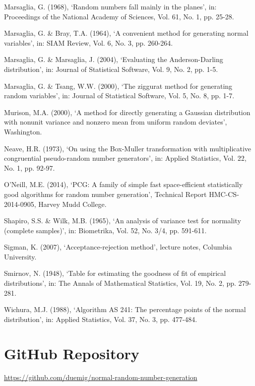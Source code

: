 \documentclass[12pt,a4paper]{article}
\begin{document}
\begin{list}{}{\leftmargin=0pt\itemsep=6pt\parsep=0pt}
\item[] [12] Marsaglia, G. (1968), `Random numbers fall mainly in the planes', in: Proceedings of the National Academy of Sciences, Vol. 61, No. 1, pp. 25-28.
\item[] [13] Marsaglia, G. \& Bray, T.A. (1964), `A convenient method for generating normal variables', in: SIAM Review, Vol. 6, No. 3, pp. 260-264.
\item[] [14] Marsaglia, G. \& Marsaglia, J. (2004), `Evaluating the Anderson-Darling distribution', in: Journal of Statistical Software, Vol. 9, No. 2, pp. 1-5.
\item[] [15] Marsaglia, G. \& Tsang, W.W. (2000), `The ziggurat method for generating random variables', in: Journal of Statistical Software, Vol. 5, No. 8, pp. 1-7.
\item[] [16] Murison, M.A. (2000), `A method for directly generating a Gaussian distribution with nonunit variance and nonzero mean from uniform random deviates', Washington.
\item[] [17] Neave, H.R. (1973), `On using the Box-Muller transformation with multiplicative congruential pseudo-random number generators', in: Applied Statistics, Vol. 22, No. 1, pp. 92-97.
\item[] [18] O'Neill, M.E. (2014), `PCG: A family of simple fast space-efficient statistically good algorithms for random number generation', Technical Report HMC-CS-2014-0905, Harvey Mudd College.
\item[] [19] Shapiro, S.S. \& Wilk, M.B. (1965), `An analysis of variance test for normality (complete samples)', in: Biometrika, Vol. 52, No. 3/4, pp. 591-611.
\item[] [20] Sigman, K. (2007), `Acceptance-rejection method', lecture notes, Columbia University.
\item[] [21] Smirnov, N. (1948), `Table for estimating the goodness of fit of empirical distributions', in: The Annals of Mathematical Statistics, Vol. 19, No. 2, pp. 279-281.
\item[] [22] Wichura, M.J. (1988), `Algorithm AS 241: The percentage points of the normal distribution', in: Applied Statistics, Vol. 37, No. 3, pp. 477-484.
\end{list}

\section*{GitHub Repository}
\url{https://github.com/duemig/normal-random-number-generation}
\end{document}
